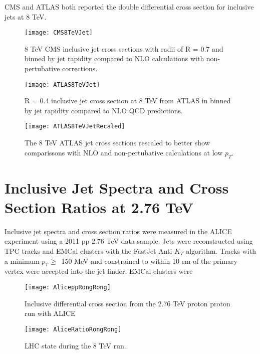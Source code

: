 \iffalse

CMS\cite{CMS:2013kda} and ATLAS\cite{Aaboud:2017dvo} both reported the double differential cross section for inclusive jets at 8 TeV.  

\begin{figure}[h]
\texttt{[image: CMS8TeVJet]}
\centering
\caption{8 TeV CMS inclusive jet cross sections with radii of R = 0.7 and binned by jet rapidity compared to NLO calculations with non-pertubative corrections\cite{CMS:2013kda}.}
\label{fig:CMS8TeVRescale}
\end{figure}

\begin{figure}[h]
\texttt{[image: ATLAS8TeVJet]}
\centering
\caption{R = 0.4 inclusive jet cross section at 8 TeV from ATLAS in binned by jet rapidity compared to NLO QCD predictions\cite{Aaboud:2017dvo}.}
\label{fig:ATLAS8TeV}
\end{figure}

\begin{figure}[h]
\texttt{[image: ATLAS8TeVJetRecaled]}
\centering
\caption{The 8 TeV ATLAS jet cross sections rescaled to better show comparissons with NLO and non-pertubative calculations at low $p_{T}$\cite{Aaboud:2017dvo}.}
\label{fig:ATLAS8TeVRescale}
\end{figure}

\section{Inclusive Jet Spectra and Cross Section Ratios at 2.76 TeV}
Inclusive jet spectra and cross section ratios were measured in the ALICE experiment using a 2011 pp 2.76 TeV data sample\cite{MA2013319}.  Jets were reconstructed using TPC tracks and EMCal clusters with the FastJet Anti-$K_{T}$ algorithm.  Tracks with a minimum $p_{T} \geq \,$ 150 MeV and constrained to within 10 cm of the primary vertex were accepted into the jet finder.  EMCal clusters were 

\begin{figure}[h]
\texttt{[image: AliceppRongRong]}
\centering
\caption{Inclusive differential cross section from the 2.76 TeV proton proton run with ALICE}
\label{fig:RunEff}
\end{figure}

\begin{figure}[h]
\texttt{[image: AliceRatioRongRong]}
\centering
\caption{LHC state during the 8 TeV run. }
\label{fig:RunEff}
\end{figure}


